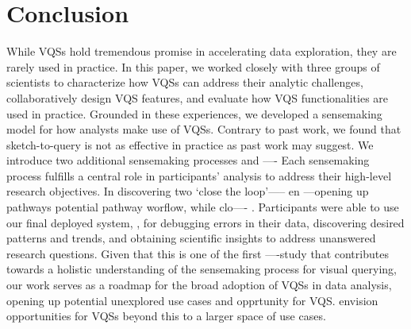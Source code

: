 \section{Conclusion\label{sec:conclusion}}
While VQSs hold tremendous promise in accelerating data exploration, they are rarely used in practice. In this paper, we worked closely with three groups of scientists to characterize how VQSs can address their analytic challenges, collaboratively design VQS features, and evaluate how VQS functionalities are used in practice. Grounded in these experiences, we developed a sensemaking model for how analysts make use of VQSs. Contrary to past work, we found that sketch-to-query is not as effective in practice as past work may suggest. We introduce two additional sensemaking processes and  ---- Each sensemaking process fulfills a central role in participants' analysis to address their high-level research objectives. In discovering two `close the loop'----- en ---opening up pathways  potential pathway worflow, while clo---- . Participants were able to use our final deployed system, \zvpp, for debugging errors in their data, discovering desired patterns and trends, and obtaining scientific insights to address unanswered research questions. Given that this is one of the first ----study that contributes towards a holistic understanding of the sensemaking process for visual querying, our work serves as a roadmap for the broad adoption of VQSs in data analysis, opening up potential unexplored use cases and opprtunity for VQS. envision opportunities for VQSs beyond this to a larger space of use cases.






